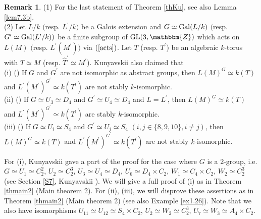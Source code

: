 \documentclass{amsart}
\theoremstyle{plain}
\theoremstyle{definition}
\newtheorem{remark}[theorem]{Remark}
\theoremstyle{remark}
\newcommand{\bZ}{\mathbbm{Z}}\newcommand{\bQ}{\mathbbm{Q}}
\newcommand{\GL}{{\rm GL}}\newcommand{\SL}{{\rm SL}}
\newcounter{sub}\def\tr{\mbox{tr }}
\begin{document}
\begin{remark}\label{rem1.18}
(1) For the last statement of Theorem \ref{thKu}, 
see also Lemma \ref{lem7.3b}.\\ 
(2) 
Let $L/k$ $($resp. $L^\prime/k)$ 
be a Galois extension and 
$G\simeq {\rm Gal}(L/k)$ $($resp. $G^\prime\simeq {\rm Gal}(L^\prime/k))$ 
be a finite subgroup of $\GL(3,\bZ)$ 
which acts on $L(M)$ 
$($resp. $L^\prime(M^\prime))$ %
via $(\ref{acts})$. 
Let $T$ (resp. $T^\prime$) be an algebraic $k$-torus 
with $\widehat{T}\simeq M$ (resp. $\widehat{T}^\prime\simeq M^\prime$). 
%
Kunyavskii \cite{Kun90} also claimed that\\
(i) (\cite[Theorem 1]{Kun90}) 
If $G$ and $G^\prime$ are not isomorphic as abstract groups, 
then $L(M)^G\simeq k(T)$ and 
$L^\prime(M^\prime)^{G^\prime}\simeq k(T^\prime)$ are not stably 
$k$-isomorphic.\\
(ii) (\cite[Remark 1, page 19]{Kun90}) 
If $G\simeq U_3\simeq D_4$ and $G^\prime\simeq U_4\simeq D_4$ 
and $L=L^\prime$, 
then $L(M)^G\simeq k(T)$ and 
$L^\prime(M^\prime)^{G^\prime}\simeq k(T^\prime)$ are stably 
$k$-isomorphic.\\
(iii) (\cite[Remark 2, page 20]{Kun90}) 
If $G\simeq U_i\simeq S_4$ and $G^\prime\simeq U_j\simeq S_4$ 
$(i,j\in\{8,9,10\}, i\neq j)$, then 
$L(M)^G\simeq k(T)$ and 
$L^\prime(M^\prime)^{G^\prime}\simeq k(T^\prime)$ are not stably 
$k$-isomorphic. 

For (i), Kunyavskii \cite{Kun90}
gave a part of the proof for the case where $G$ is a $2$-group, 
i.e. $G\simeq U_1\simeq C_2^2$, $U_2\simeq C_2^3$, $U_3\simeq U_4\simeq D_4$, 
$U_6\simeq D_4\times C_2$, $W_1\simeq C_4\times C_2$, $W_2\simeq C_2^3$  
(see Section \ref{S7}, Kunyavskii \cite[Section 4 and Section 5]{Kun90}). 
We will give a full proof of (i) 
as in Theorem \ref{thmain2} (Main theorem 2). 
For (ii), (iii), we will disprove these assertions as in Theorem \ref{thmain2} (Main theorem 2) (see also Example \ref{ex1.26}). 
Note that we also have isomorphisms $U_{11}\simeq U_{12}\simeq S_4\times C_2$, 
$U_2\simeq W_2\simeq C_2^3$, $U_7\simeq W_3\simeq A_4\times C_2$. 
\end{remark}
\end{document}
